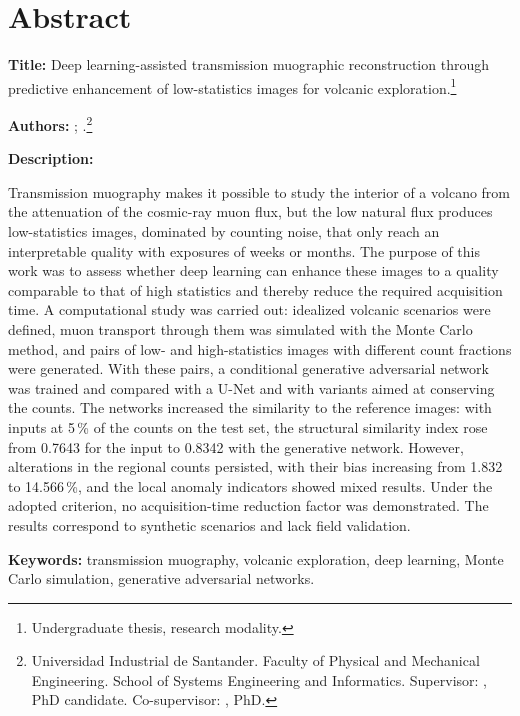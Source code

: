 \chapter*{Abstract}
\label{pre:abstract}

\begingroup
{}
\setlength{\parindent}{0pt}
\setlength{\parskip}{0.7em}

\textbf{Title:} Deep learning-assisted transmission muographic reconstruction through predictive enhancement of low-statistics images for volcanic exploration.\footnote{Undergraduate thesis, research modality.}

\textbf{Authors:} \AutorUno; \AutorDos.\footnote{Universidad Industrial de Santander. Faculty of Physical and Mechanical Engineering. School of Systems Engineering and Informatics. Supervisor: \DirectorNombre, PhD candidate. Co-supervisor: \CodirectorNombre, PhD.}

\textbf{Description:}

Transmission muography makes it possible to study the interior of a volcano from the attenuation of the cosmic-ray muon flux, but the low natural flux produces low-statistics images, dominated by counting noise, that only reach an interpretable quality with exposures of weeks or months. The purpose of this work was to assess whether deep learning can enhance these images to a quality comparable to that of high statistics and thereby reduce the required acquisition time. A computational study was carried out: idealized volcanic scenarios were defined, muon transport through them was simulated with the Monte Carlo method, and pairs of low- and high-statistics images with different count fractions were generated. With these pairs, a conditional generative adversarial network was trained and compared with a U-Net and with variants aimed at conserving the counts. The networks increased the similarity to the reference images: with inputs at 5\,\% of the counts on the test set, the structural similarity index rose from 0.7643 for the input to 0.8342 with the generative network. However, alterations in the regional counts persisted, with their bias increasing from 1.832 to 14.566\,\%, and the local anomaly indicators showed mixed results. Under the adopted criterion, no acquisition-time reduction factor was demonstrated. The results correspond to synthetic scenarios and lack field validation.

\textbf{Keywords:} transmission muography, volcanic exploration, deep learning, Monte Carlo simulation, generative adversarial networks.

\endgroup
